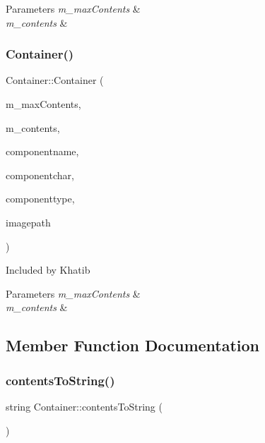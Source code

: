 \begin{DoxyParams}{Parameters}
{\em m\+\_\+max\+Contents} & \\
\hline
{\em m\+\_\+contents} & \\
\hline
\end{DoxyParams}
\hypertarget{class_container_ab7f8067097f7f58cb1b251069af3c8ad}{}\label{class_container_ab7f8067097f7f58cb1b251069af3c8ad} 
\subsubsection{\texorpdfstring{Container()}{Container()}\hspace{0.1cm}{\footnotesize\ttfamily [2/2]}}
{\footnotesize\ttfamily Container\+::\+Container (\begin{DoxyParamCaption}\item[{int}]{m\+\_\+max\+Contents,  }\item[{vector$<$ \hyperlink{class_item}{Item} $\ast$$>$}]{m\+\_\+contents,  }\item[{std\+::string}]{componentname,  }\item[{char}]{componentchar,  }\item[{gameplay\+Grid\+Component\+Types}]{componenttype,  }\item[{std\+::string}]{imagepath }\end{DoxyParamCaption})}

Included by Khatib 
\begin{DoxyParams}{Parameters}
{\em m\+\_\+max\+Contents} & \\
\hline
{\em m\+\_\+contents} & \\
\hline
\end{DoxyParams}


\subsection{Member Function Documentation}
\hypertarget{class_container_ab00aa23e1f650444e153301a7a247116}{}\label{class_container_ab00aa23e1f650444e153301a7a247116} 
\subsubsection{\texorpdfstring{contents\+To\+String()}{contentsToString()}}
{\footnotesize\ttfamily string Container\+::contents\+To\+String (\begin{DoxyParamCaption}{ }\end{DoxyParamCaption})}

